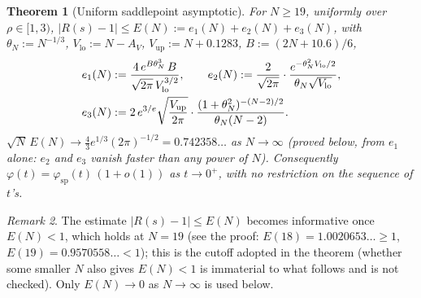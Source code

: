 \documentclass[11pt]{article}
\newtheorem{theorem}{Theorem}[section]
\theoremstyle{definition}
\theoremstyle{remark}
\newtheorem{remark}[theorem]{Remark}
\begin{document}
\begin{theorem}[Uniform saddlepoint asymptotic]
\label{thm:formulaA}
For $N\ge19$, uniformly over $\rho\in[1,3)$, $|R(s)-1|\le E(N) := e_1(N)+e_2(N)+e_3(N)$, with
$\theta_N := N^{-1/3}$, $V_{\mathrm{lo}} := N-A_V$, $V_{\mathrm{up}} := N+0.1283$,
$B := (2N+10.6)/6$,
\begin{align}
e_1(N) &:= \frac{4\,e^{B\theta_N^3}\,B}{\sqrt{2\pi}\,V_{\mathrm{lo}}^{3/2}}, \qquad
e_2(N) := \frac{2}{\sqrt{2\pi}}\cdot\frac{e^{-\theta_N^2V_{\mathrm{lo}}/2}}{\theta_N\sqrt{V_{\mathrm{lo}}}},
\label{eq:Ebound}\\
e_3(N) &:= 2\,e^{3/e}\sqrt{\frac{V_{\mathrm{up}}}{2\pi}}\cdot
\frac{(1+\theta_N^2)^{-(N-2)/2}}{\theta_N(N-2)}. \notag
\end{align}
$\sqrt N\,E(N) \to \tfrac43e^{1/3}(2\pi)^{-1/2} = 0.742358\ldots$ as $N\to\infty$
(proved below, from $e_1$ alone: $e_2$ and $e_3$ vanish faster than any power of $N$).
Consequently $\varphi(t) = \varphi_{\mathrm{sp}}(t)\,(1+o(1))$ as $t \to 0^+$, with no restriction
on the sequence of $t$'s.
\end{theorem}

\begin{remark}
The estimate $|R(s)-1|\le E(N)$ becomes informative once $E(N)<1$, which holds at $N=19$ (see the
proof: $E(18)=1.0020653\ldots\ge1$, $E(19)=0.9570558\ldots<1$); this is the cutoff adopted in the
theorem (whether some smaller $N$ also gives $E(N)<1$ is immaterial to what follows and
is not checked). Only $E(N)\to0$ as $N\to\infty$ is used below.
\end{remark}
\end{document}
